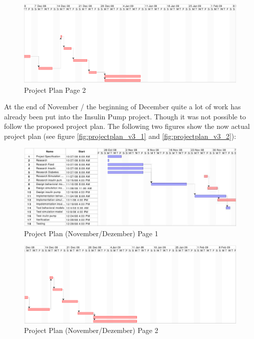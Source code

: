 \begin{figure}[htb]
\centering
\includegraphics[width=\textwidth]{images/projectplan_page2}
\caption{Project Plan Page 2}
\label{fig:projectplan2}
\end{figure}

\newpage
At the end of November / the beginning of December quite a lot of work has
already been put into the Insulin Pump project.
Though it was not possible to follow the proposed project plan.
The following two figures show the now actual project plan (see figure
\vref{fig:projectplan_v3_1} and \vref{fig:projectplan_v3_2}):

\begin{figure}[htb]
\centering
\includegraphics[width=\textwidth]{images/projectplan_v3_page1}
\caption{Project Plan (November/Dezember) Page 1}
\label{fig:projectplan_v3_1}
\end{figure}

\begin{figure}[htb]
\centering
\includegraphics[width=\textwidth]{images/projectplan_v3_page2}
\caption{Project Plan (November/Dezember) Page 2}
\label{fig:projectplan_v3_2}
\end{figure}

